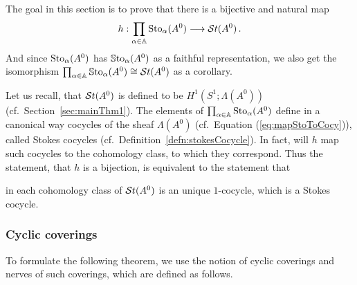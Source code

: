 The goal in this section is to prove that there is a bijective and natural map
\[
  h:\prod_{\alpha\in\mathbb{A}}\operatorname{Sto}_\alpha(A^0)\longrightarrow\mathcal{S}{}t(A^0) \,.
\]
And since $\operatorname{Sto}_\alpha(A^0)$ has $\operatorname{\mathbb{S}to}_\alpha(A^0)$ as a faithful
representation, we also get the isomorphism
$\prod_{\alpha\in\mathbb{A}}\operatorname{\mathbb{S}to}_\alpha(A^0)\cong\mathcal{S}{}t(A^0)$ as a corollary.

Let us recall, that $\mathcal{S}{}t(A^0)$ is defined to be $H^1(S^1;\Lambda(A^0))$
(cf.\ Section~\ref{sec:mainThm1}).
The elements of $\prod_{\alpha\in\mathbb{A}}\operatorname{Sto}_\alpha(A^0)$ define in a canonical way
cocycles of the sheaf $\Lambda(A^0)$ (cf.\ Equation (\ref{eq:mapStoToCocy})),
called Stokes cocycles (cf.\ Definition~\ref{defn:stokesCocycle}).
In fact, will $h$ map such cocycles to the cohomology class, to which they
correspond.
Thus the statement, that $h$ is a bijection, is equivalent to the statement
that
\begin{einr}
  in each cohomology class of $\mathcal{S}{}t(A^0)$ is an unique $1$-cocycle, which is a
  Stokes cocycle.
\end{einr}

\subsubsection{Cyclic coverings}
To formulate the following theorem, we use the notion of cyclic coverings and
nerves of such coverings, which are defined as follows.

